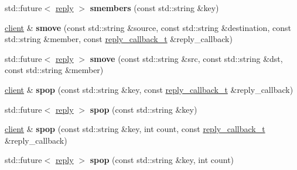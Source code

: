 \begin{DoxyCompactItemize}
\item 
\mbox{\label{classcpp__redis_1_1client_a4cdd71bfb45eb37c593d6733ba83f09a}} 
std\+::future$<$ \hyperlink{classcpp__redis_1_1reply}{reply} $>$ {\bfseries smembers} (const std\+::string \&key)
\item 
\mbox{\label{classcpp__redis_1_1client_a0768130822a976cfa3e27310c7a14417}} 
\hyperlink{classcpp__redis_1_1client}{client} \& {\bfseries smove} (const std\+::string \&source, const std\+::string \&destination, const std\+::string \&member, const \hyperlink{classcpp__redis_1_1client_a061a1140d36d2eaeda82b09a0bb3f9f2}{reply\+\_\+callback\+\_\+t} \&reply\+\_\+callback)
\item 
\mbox{\label{classcpp__redis_1_1client_a4524b915c1180a4c57ffb16f660108ba}} 
std\+::future$<$ \hyperlink{classcpp__redis_1_1reply}{reply} $>$ {\bfseries smove} (const std\+::string \&src, const std\+::string \&dst, const std\+::string \&member)
\item 
\mbox{\label{classcpp__redis_1_1client_a9a59ca9396d1447ae3a8bb584449e174}} 
\hyperlink{classcpp__redis_1_1client}{client} \& {\bfseries spop} (const std\+::string \&key, const \hyperlink{classcpp__redis_1_1client_a061a1140d36d2eaeda82b09a0bb3f9f2}{reply\+\_\+callback\+\_\+t} \&reply\+\_\+callback)
\item 
\mbox{\label{classcpp__redis_1_1client_aabd8e3ddf02299eb129af8ad27555282}} 
std\+::future$<$ \hyperlink{classcpp__redis_1_1reply}{reply} $>$ {\bfseries spop} (const std\+::string \&key)
\item 
\mbox{\label{classcpp__redis_1_1client_a75a34f373c405999036a1e7e476ff201}} 
\hyperlink{classcpp__redis_1_1client}{client} \& {\bfseries spop} (const std\+::string \&key, int count, const \hyperlink{classcpp__redis_1_1client_a061a1140d36d2eaeda82b09a0bb3f9f2}{reply\+\_\+callback\+\_\+t} \&reply\+\_\+callback)
\item 
\mbox{\label{classcpp__redis_1_1client_acde89afde549cbe7ead5453fd3635081}} 
std\+::future$<$ \hyperlink{classcpp__redis_1_1reply}{reply} $>$ {\bfseries spop} (const std\+::string \&key, int count)

\end{DoxyCompactItemize}

